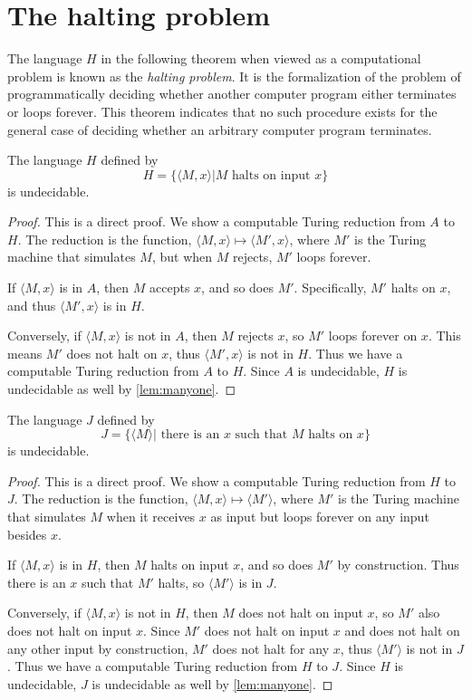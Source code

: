 \section{The halting problem}

The language $H$ in the following theorem when viewed as a computational problem is known as the \emph{halting problem}.
It is the formalization of the problem of programmatically deciding whether another computer program either terminates or loops forever.
This theorem indicates that no such procedure exists for the general case of deciding whether an arbitrary computer program terminates.

\begin{theorem}
  The language $H$ defined by
  $$
  H = \{ \langle M, x \rangle | M \text{ halts on input } x\}
  $$
  is undecidable.
\end{theorem}
\begin{proof}
  This is a direct proof.
  We show a computable Turing reduction from $A$ to $H$.
  The reduction is the function, $\langle M, x \rangle \mapsto \langle M', x \rangle$, where $M'$ is the Turing machine that simulates $M$, but when $M$ rejects, $M'$ loops forever.

  If $\langle M, x \rangle$ is in $A$, then $M$ accepts $x$, and so does $M'$.
  Specifically, $M'$ halts on $x$, and thus $\langle M', x \rangle$ is in $H$.

  Conversely, if $\langle M, x \rangle$ is not in $A$, then $M$ rejects $x$, so $M'$ loops forever on $x$.
  This means $M'$ does not halt on $x$, thus $\langle M', x \rangle$ is not in $H$.
  Thus we have a computable Turing reduction from $A$ to $H$.
  Since $A$ is undecidable, $H$ is undecidable as well by \autoref{lem:manyone}.
\end{proof}

\begin{theorem}
  The language $J$ defined by
  $$
  J = \{ \langle M \rangle | \text{ there is an } x \text{ such that } M \text{ halts on } x\}
  $$
  is undecidable.
\end{theorem}
\begin{proof}
  This is a direct proof.
  We show a computable Turing reduction from $H$ to $J$.
  The reduction is the function, $\langle M, x \rangle \mapsto \langle M' \rangle$, where $M'$ is the Turing machine that simulates $M$ when it receives $x$ as input but loops forever on any input besides $x$.

  If $\langle M, x \rangle$ is in $H$, then $M$ halts on input $x$, and so does $M'$ by construction.
  Thus there is an $x$ such that $M'$ halts, so $\langle M' \rangle$ is in $J$.

  Conversely, if $\langle M, x \rangle$ is not in $H$, then $M$ does not halt on input $x$, so $M'$ also does not halt on input $x$.
  Since $M'$ does not halt on input $x$ and does not halt on any other input by construction, $M'$ does not halt for any $x$, thus $\langle M' \rangle$ is not in $J$.
  Thus we have a computable Turing reduction from $H$ to $J$.
  Since $H$ is undecidable, $J$ is undecidable as well by \autoref{lem:manyone}.
\end{proof}
